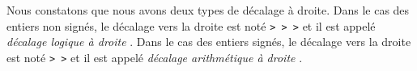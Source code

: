 Nous constatons que nous avons deux types de décalage à droite.
Dans le cas des entiers non signés, le décalage vers la droite est noté \texttt{>\,\!>\,\!>} et il est appelé \emph{\og décalage logique à droite \fg}.
Dans le cas des entiers signés, le décalage vers la droite est noté \texttt{>\,\!>} et il est appelé \emph{\og décalage arithmétique à droite \fg}.